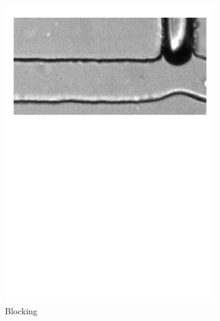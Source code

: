 \begin{figure}[h!]
\begin{subfigure}{0.24\linewidth}
		\includegraphics[page=8,clip,trim={10mm 190mm 00mm 20mm},width=\linewidth]{Ressourcen/PinchOff/Squeezing}
		\caption{Blocking}
		\label{fig:fluidics:droplet:squeezing:blocking}
	\end{subfigure}
	\hfil
	\begin{subfigure}{0.24\linewidth}
		\centering

\end{subfigure}
\end{figure}
